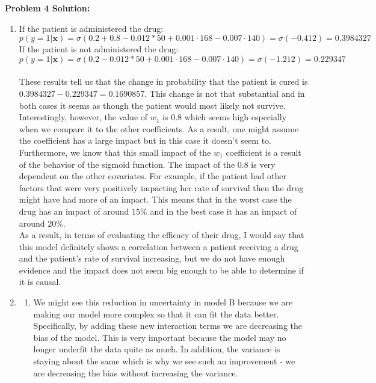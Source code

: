 \documentclass[submit]{harvardml}
\begin{document}
\newpage
\textbf{Problem 4 Solution:}\\
\begin{enumerate}
    \item If the patient is administered the drug:\\
    $$p(y=1 | \mathbf{x}) = \sigma(0.2 + 0.8 - 0.012*50 +   0.001\cdot168 - 0.007\cdot140) = \sigma(-0.412) = 0.3984327$$
    If the patient is not administered the drug:\\
    $$p(y=1 | \mathbf{x}) = \sigma(0.2 - 0.012*50 +   0.001\cdot168 - 0.007\cdot140) = \sigma(-1.212) = 0.229347$$\\
    These results tell us that the change in probability that the patient is cured is $0.3984327 - 0.229347 = 0.1690857$. This change is not that substantial and in both cases it seems as though the patient would most likely not survive. Interestingly, however, the value of $w_1$ is $0.8$ which seems high especially when we compare it to the other coefficients. As a result, one might assume the coefficient has a large impact but in this case it doesn't seem to. Furthermore, we know that this small impact of the $w_1$ coefficient is a result of the behavior of the sigmoid function. The impact of the $0.8$ is very dependent on the other covariates. For example, if the patient had other factors that were very positively impacting her rate of survival then the drug might have had more of an impact. This means that in the worst case the drug has an impact of around $15\%$ and in the best case it has an impact of around $20\%$. \\
    As a result, in terms of evaluating the efficacy of their drug, I would say that this model definitely shows a correlation between a patient receiving a drug and the patient's rate of survival increasing, but we do not have enough evidence and the impact does not seem big enough to be able to determine if it is causal. \\
    \item
    \begin{enumerate}
        \item We might see this reduction in uncertainty in model B because we are making our model more complex so that it can fit the data better. Specifically, by adding these new interaction terms we are decreasing the bias of the model. This is very important because the model may no longer underfit the data quite as much. In addition, the variance is staying about the same which is why we see such an improvement - we are decreasing the bias without increasing the variance.

\end{enumerate}
\end{enumerate}
\end{document}
